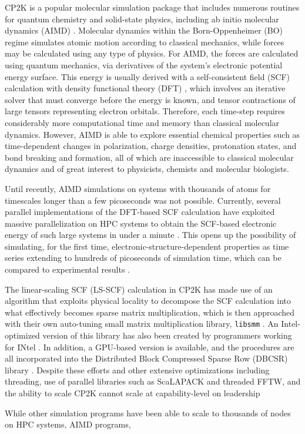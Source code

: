 CP2K \cite{hutter2014cp2k} is a popular molecular simulation package that includes numerous routines for quantum chemistry and solid-state physics, including ab initio molecular dynamics (AIMD) \cite{marx2009ab}. Molecular dynamics within the Born-Oppenheimer (BO) regime simulates atomic motion  according to classical mechanics, while forces may be calculated using any type of physics. For AIMD, the forces are calculated using quantum mechanics, via derivatives of the system's electronic potential energy surface. This energy is usually derived with a self-consistent field (SCF) calculation with density functional theory (DFT) \cite{vandevondele2012linear,hutter2014cp2k}, which involves an iterative solver that must converge before the energy is known, and tensor contractions of large tensors representing electron orbitals. Therefore, each time-step requires considerably more computational time and memory than classical molecular dynamics. However, AIMD is able to explore essential chemical properties such as time-dependent changes in polarization, charge densities, protonation states, and bond breaking and formation, all of which are inaccessible to classical molecular dynamics and of great interest to physicists, chemists and molecular biologists.

Until recently, AIMD simulations on systems with thousands of atoms for timescales longer than a few picoseconds was not possible. Currently, several parallel implementations of the DFT-based SCF calculation have exploited massive parallelization on HPC systems to obtain the SCF-based electronic energy of such large systems in under a minute \cite{vasp_bench,kresse1996efficient,cp2k_bench,vandevondele2012linear}. This opens up the possibility of simulating, for the first time, electronic-structure-dependent properties as time series extending to hundreds of picoseconds of simulation time, which can be compared to experimental results \cite{gillan2016perspective, pestana2017ab, hassanali2013proton, milovanovic2018new, sellner2013charge}.

The linear-scaling SCF (LS-SCF) calculation \cite{vandevondele2012linear} in CP2K has made use of an algorithm that exploits physical locality to decompose the SCF calculation into what effectively becomes sparse matrix multiplication, which is then approached with their own auto-tuning small matrix multiplication library, \texttt{libsmm} \cite{borvstnik2014sparse}. An Intel-optimized version of this library has also been created by programmers working for INtel \cite{heinecke2016libxsmm}. In addition, a GPU-based version is available, and the procedures are all incorporated into the Distributed Block Compressed Sparse Row (DBCSR) library \cite{borvstnik2014sparse,schutt2016gpu}. Despite these efforts and other extensive optimizations including  threading, use of parallel libraries such as ScaLAPACK and threaded FFTW, and the ability to scale CP2K cannot scale at capability-level on leadership 

While other simulation programs have been able to scale to thousands of nodes on HPC systems, AIMD programs, 